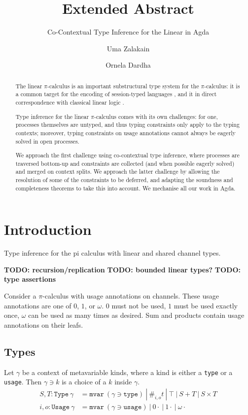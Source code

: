 \documentclass[sigplan,screen,review]{acmart}
\title{Extended Abstract}
\subtitle{Co-Contextual Type Inference for the Linear \Picalc{} in Agda}
\author{Uma Zalakain}
\affiliation{University of Glasgow}
\author{Ornela Dardha}
\affiliation{University of Glasgow}
\newcommand{\picalc}{$\pi$-calculus}
\begin{document}
\begin{abstract}
  The linear \picalc{} is an important substructural type system for the \picalc{}:
  it is a common target for the encoding of session-typed languages ,
  and it in direct correspondence with classical linear logic .

  Type inference for the linear \picalc{} comes with its own challenges:
  for one, processes themselves are untyped, and thus typing constraints only apply to the typing contexts;
  moreover, typing constraints on usage annotations cannot always be eagerly solved in open processes.

  We approach the first challenge using co-contextual type inference, where processes are traversed bottom-up and constraints are collected (and when possible eagerly solved) and merged on context splits.
  We approach the latter challenge by allowing the resolution of some of the constraints to be deferred, and adapting the soundness and completeness theorems to take this into account.
  We mechanise all our work in Agda.
\end{abstract}


\maketitle

\section{Introduction}\label{introduction}

\cite{ErdwegBKKM15}

Type inference for the pi calculus with linear and shared channel types.

\textbf{TODO: recursion/replication} \textbf{TODO: bounded linear
types?} \textbf{TODO: type assertions}

Consider a \(\pi\)-calculus with usage annotations on channels. These
usage annotations are one of \(0\), \(1\), or \(\omega\). \(0\) must not
be used, \(1\) must be used exactly once, \(\omega\) can be used as many
times as desired. Sum and products contain usage annotations on their
leafs.

\hypertarget{types}{%
\subsection{Types}\label{types}}

Let \(\gamma\) be a context of metavariable kinds, where a kind is
either a \texttt{type} or a \texttt{usage}. Then \(\gamma \ni k\) is a
choice of a \(k\) inside \(\gamma\). \[
\begin{aligned}
S, T : \texttt{Type}~\gamma &= \texttt{mvar}~(\gamma \ni \texttt{type}) ~|~ \#_{i,o}t ~|~ \top ~|~ S + T ~|~ S \times T \\
i,o : \texttt{Usage}~\gamma &= \texttt{mvar}~(\gamma \ni \texttt{usage}) ~|~ 0\cdot ~|~ 1\cdot ~|~ \omega\cdot
\end{aligned}
\]
\end{document}

